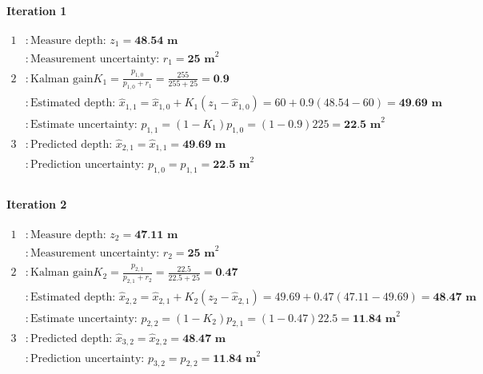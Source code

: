 \begin{fitbox}[frametitle=Example]
    \paragraph*{Iteration 1}
    \begin{equation*}
        \begin{aligned}
            1 &: \text{Measure depth: } z_1 = \textbf{48.54 m} \\
                &: \text{Measurement uncertainty: } r_1 = \textbf{25 m}^2 \\
            2 &: \text{Kalman gain} K_1 = \frac{p_{1,0}}{p_{1,0}+r_1} = \frac{255}{255 + 25} = \textbf{0.9} \\
                &: \text{Estimated depth: } \hat{x}_{1,1} = \hat{x}_{1,0} + K_1(z_1 - \hat{x}_{1,0}) = 60 + 0.9(48.54-60) = \textbf{49.69 m} \\
                &: \text{Estimate uncertainty: } p_{1,1} = (1-K_1)p_{1,0} = (1-0.9)225 = \textbf{22.5 m}^2 \\
            3 &: \text{Predicted depth: } \hat{x}_{2,1} = \hat{x}_{1,1} = \textbf{49.69 m} \\
                &: \text{Prediction uncertainty: } p_{1,0} = p_{1,1} = \textbf{22.5 m}^2 \\
        \end{aligned}
    \end{equation*}

    \paragraph*{Iteration 2}
    \begin{equation*}
        \begin{aligned}
            1 &: \text{Measure depth: } z_2 = \textbf{47.11 m} \\
                &: \text{Measurement uncertainty: } r_2 = \textbf{25 m}^2 \\
            2 &: \text{Kalman gain} K_2 = \frac{p_{2,1}}{p_{2,1}+r_2} = \frac{22.5}{22.5 + 25} = \textbf{0.47} \\
                &: \text{Estimated depth: } \hat{x}_{2,2} = \hat{x}_{2,1} + K_2(z_2 - \hat{x}_{2,1}) = 49.69 + 0.47(47.11-49.69) = \textbf{48.47 m} \\
                &: \text{Estimate uncertainty: } p_{2,2} = (1-K_2)p_{2,1} = (1-0.47)22.5 = \textbf{11.84 m}^2 \\
            3 &: \text{Predicted depth: } \hat{x}_{3,2} = \hat{x}_{2,2} = \textbf{48.47 m} \\
                &: \text{Prediction uncertainty: } p_{3,2} = p_{2,2} = \textbf{11.84 m}^2 \\
        \end{aligned}
    \end{equation*}


\end{fitbox}

